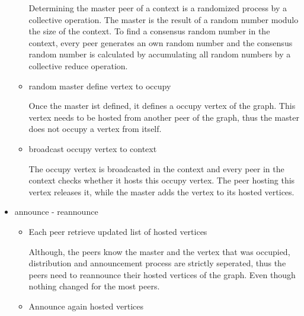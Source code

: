 \begin{itemize}
\begin{itemize}
    Determining the master peer of a context is a randomized process
    by a collective operation. The master is the result of a random
    number modulo the size of the context. To find a consensus random
    number in the context, every peer generates an own random number
    and the consensus random number is calculated by accumulating all
    random numbers by a collective reduce operation.

  \item random master define vertex to occupy
    
    Once the master ist defined, it defines a occupy vertex of the
    graph. This vertex needs to be hosted from another peer of the
    graph, thus the master does not occupy a vertex from itself.
    
  \item broadcast occupy vertex to context

    The occupy vertex is broadcasted in the context and every peer in
    the context checks whether it hosts this occupy vertex. The peer
    hosting this vertex releases it, while the master adds the vertex
    to its hosted vertices.

  \end{itemize}
\item announce - reannounce
  \begin{itemize}
  \item Each peer retrieve updated list of hosted vertices

    Although, the peers know the master and the vertex that was
    occupied, distribution and announcement process are strictly
    seperated, thus the peers need to reannounce their hosted vertices
    of the graph. Even though nothing changed for the most peers.

  \item Announce again hosted vertices
  \end{itemize}


\end{itemize}


\cleardoublepage

